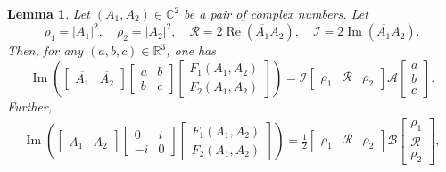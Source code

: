 \documentclass[11pt,a4paper,oneside]{amsart}
\theoremstyle{plain}
\newtheorem{lemma}[theorem]{Lemma}
\theoremstyle{remark}
\numberwithin{equation}{section}
\newcommand{\C}{\mathbb{C}}
\newcommand{\R}{\mathbb{R}}
\renewcommand{\Im}{\operatorname{Im}}
\renewcommand{\Re}{\operatorname{Re}}
\def\({\left(}
\def\){\right)}
\theoremstyle{definition}
\begin{document}
\begin{lemma}\label{L:quadidentity}
Let $(A_1,A_2) \in \C^2$ be a pair of complex numbers. Let
\begin{equation*}%
	\rho_1 = |A_1|^2 , \quad \rho_2 = |A_2|^2, \quad \mathcal{R} = 2\Re (\overline{A_1} A_2), \quad \mathcal{I} = 2 \Im (\overline{A_1} A_2).
\end{equation*}
Then, for any $(a,b,c) \in \R^3$, one has
\begin{equation}\label{E:qqq1}
 	\Im \(\begin{bmatrix} 
	\overline{A_1} & \overline{A_2} 
	\end{bmatrix}
	\begin{bmatrix}
	a & b  \\ b  & c
	\end{bmatrix}
	\begin{bmatrix}
	F_1 (A_1,A_2) \\
	F_2 (A_1,A_2)
	\end{bmatrix}
	\)	
	= \mathcal{I} \begin{bmatrix} \rho_1 & \mathcal{R} & \rho_2  \end{bmatrix}
	\mathscr{A} \begin{bmatrix} a \\ b \\ c \end{bmatrix}.
\end{equation}
Further,
\begin{equation}\label{E:qqq2}
\begin{aligned}
 	\Im \(\begin{bmatrix} 
	\overline{A_1} & \overline{A_2} 
	\end{bmatrix}
	\begin{bmatrix}
	0 & i  \\ -i  & 0
	\end{bmatrix}
	\begin{bmatrix}
	F_1 (A_1,A_2) \\
	F_2 (A_1,A_2)
	\end{bmatrix}
	\)
= \tfrac12 \begin{bmatrix} \rho_1 & \mathcal{R} & \rho_2  \end{bmatrix} 
\mathscr{B}
\begin{bmatrix} \rho_1 \\ \mathcal{R} \\ \rho_2  \end{bmatrix} ,

\end{aligned}
\end{equation}
\end{lemma}
\end{document}
